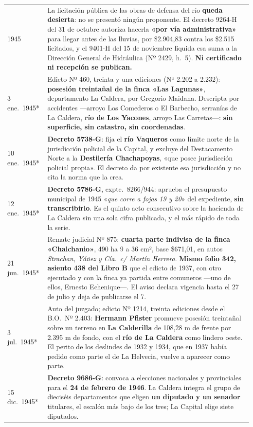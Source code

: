 \begin{longtable}{@{}p{2.7cm}p{10.3cm}@{}}
1945 & La licitación pública de las obras de defensa del río \textbf{queda desierta}: no se presentó ningún proponente. El decreto 9264-H del 31 de octubre autoriza hacerla \textbf{«por vía administrativa»} para llegar antes de las lluvias, por \$2.904,83 contra los \$2.515 licitados, y el 9401-H del 15 de noviembre liquida esa suma a la Dirección General de Hidráulica (Nº 2429, h.\ 5). \textbf{Ni certificado ni recepción se publican.} \\
3 ene.\ 1945* & Edicto Nº 460, treinta y una ediciones (Nº 2.202 a 2.232): \textbf{posesión treintañal de la finca «Las Lagunas»}, departamento La Caldera, por Gregorio Maidana. Descripta por accidentes ---arroyo Los Comederos o El Barbecho, serranías de La Caldera, \textbf{río de Los Yacones}, arroyo Las Carretas---: \textbf{sin superficie, sin catastro, sin coordenadas}. \\
10 ene.\ 1945* & \textbf{Decreto 5738-G}: fija el \textbf{río Vaqueros} como límite norte de la jurisdicción policial de la Capital, y excluye del Destacamento Norte a la \textbf{Destilería Chachapoyas}, «que posee jurisdicción policial propia». El decreto da por existente esa jurisdicción y no cita la norma que la crea. \\
12 ene.\ 1945* & \textbf{Decreto 5786-G}, expte.\ 8266/944: aprueba el presupuesto municipal de 1945 «\textit{que corre a fojas 19 y 20}» del expediente, \textbf{sin transcribirlo}. Es el quinto acto consecutivo sobre la hacienda de La Caldera sin una sola cifra publicada, y el más rápido de toda la serie. \\
21 jun.\ 1945* & Remate judicial Nº 875: \textbf{cuarta parte indivisa de la finca «Chalchanio»}, 490 ha 9 a 36 cm², base \$671,01, en autos \textit{Strachan, Yáñez y Cía.\ c/ Martín Herrera}. \textbf{Mismo folio 342, asiento 438 del Libro B} que el edicto de 1937, con otro ejecutado y con la finca ya partida entre comuneros ---uno de ellos, Ernesto Echenique---. El aviso declara vigencia hasta el 27 de julio y deja de publicarse el 7. \\
3 jul.\ 1945* & Auto del juzgado; edicto Nº 1214, treinta ediciones desde el B.O.\ Nº 2.403: \textbf{Hermann Pfister\index{Pfister, Hermann}} promueve posesión treintañal sobre un terreno en \textbf{La Calderilla} de 108,28 m de frente por 2.395 m de fondo, con el \textbf{río de La Caldera} como lindero oeste. El perito de los deslindes de 1932 y 1934, que en 1937 había pedido como parte el de La Helvecia, vuelve a aparecer como parte. \\
15 dic.\ 1945* & \textbf{Decreto 9686-G}: convoca a elecciones nacionales y provinciales para el \textbf{24 de febrero de 1946}. La Caldera integra el grupo de dieciséis departamentos que eligen \textbf{un diputado y un senador} titulares, el escalón más bajo de los tres; La Capital elige siete diputados. \\

\end{longtable}
